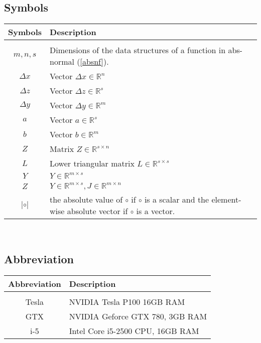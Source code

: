 \subsection{Symbols}
\begin{tabular}{c|l}
	Symbols & Description \\
	\hline \\
	 $m,n,s$ & Dimensions of the data structures of a function in abs-normal (\ref{absnf}). \\
	 $\Delta x$ & Vector $\Delta x \in \mathbb{R}^n$ \\
	 $\Delta z$ & Vector $\Delta z \in \mathbb{R}^s$ \\
	 $\Delta y$ & Vector $\Delta y \in \mathbb{R}^m$ \\
	 $a$		& Vector $a \in \mathbb{R}^s$ \\
	 $b$		& Vector $b \in \mathbb{R}^{m}$ \\
	 $Z$		& Matrix $Z \in \mathbb{R}^{s\times n}$ \\
	 $L$	    & Lower triangular matrix $L \in \mathbb{R}^{s \times s}$ \\
	 $Y$		& $Y \in \mathbb{R}^{m \times s}$ \\
	 $Z$		& $Y \in \mathbb{R}^{m \times s}, J \in \mathbb{R}^{m \times n}$ \\
	 $|\circ|$  & the absolute value of $\circ$ if $\circ$ is a scalar and the element-wise absolute vector if $\circ$ is a vector.
\end{tabular} \\

\subsection{Abbreviation}
\begin{tabular}{c|l}
	Abbreviation & Description \\
	\hline \\
	Tesla & NVIDIA Tesla P100 16GB RAM \\
	GTX & NVIDIA Geforce GTX 780, 3GB RAM \\
	i-5 & Intel Core i5-2500 CPU, 16GB RAM
\end{tabular}